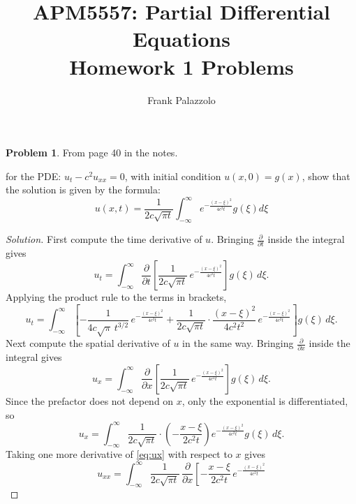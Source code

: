 \documentclass[11pt]{article}
\title{APM5557: Partial Differential Equations\\Homework 1 Problems}
\author{Frank Palazzolo}
\date{}
\newcommand{\pd}[2]{\frac{\partial #1}{\partial #2}}
\theoremstyle{definition}
\newtheorem{problem}{Problem}
\begin{document}
\maketitle

\begin{problem}
From page 40 in the notes.

for the PDE: 
$u_t - c^2 u_{xx} = 0$, 
with initial condition $u(x,0) = g(x)$, 
show that the solution is given by the formula:
\begin{equation} \label{eq:solution}
u(x,t) = \frac{1}{2c\sqrt{\pi t}} \int_{-\infty}^{\infty} e^{-\frac{(x-\xi)^2}{4c^2t}} g(\xi) d\xi
\end{equation}
\end{problem}

\begin{proof}[Solution]
First compute the time derivative of $u$. Bringing $\pd{}{t}$ inside the
integral gives
\begin{equation} \label{eq:ut-inside}
u_t = \int_{-\infty}^{\infty} \pd{}{t}\left[
  \frac{1}{2c\sqrt{\pi t}} \, e^{-\frac{(x-\xi)^2}{4c^2t}}
\right] g(\xi) \, d\xi.
\end{equation}
Applying the product rule to the terms in brackets,
\begin{equation} \label{eq:ut}
u_t = \int_{-\infty}^{\infty} \left[
  -\frac{1}{4c\sqrt{\pi}\, t^{3/2}} \, e^{-\frac{(x-\xi)^2}{4c^2t}}
  + \frac{1}{2c\sqrt{\pi t}} \cdot \frac{(x-\xi)^2}{4c^2t^2} \,
    e^{-\frac{(x-\xi)^2}{4c^2t}}
\right] g(\xi) \, d\xi.
\end{equation}
Next compute the spatial derivative of $u$ in the same way. Bringing
$\pd{}{x}$ inside the integral gives
\begin{equation} \label{eq:ux-inside}
u_x = \int_{-\infty}^{\infty} \pd{}{x}\left[
  \frac{1}{2c\sqrt{\pi t}} \, e^{-\frac{(x-\xi)^2}{4c^2t}}
\right] g(\xi) \, d\xi.
\end{equation}
Since the prefactor does not depend on $x$, only the exponential is
differentiated, so
\begin{equation} \label{eq:ux}
u_x = \int_{-\infty}^{\infty}
  \frac{1}{2c\sqrt{\pi t}} \cdot \left(-\frac{x-\xi}{2c^2t}\right)
  e^{-\frac{(x-\xi)^2}{4c^2t}} g(\xi) \, d\xi.
\end{equation}
Taking one more derivative of \eqref{eq:ux} with respect to $x$ gives
\begin{equation} \label{eq:uxx-inside}
u_{xx} = \int_{-\infty}^{\infty}
  \frac{1}{2c\sqrt{\pi t}} \, \pd{}{x}\left[
    -\frac{x-\xi}{2c^2t} \, e^{-\frac{(x-\xi)^2}{4c^2t}}

\end{equation}
\end{proof}
\end{document}
